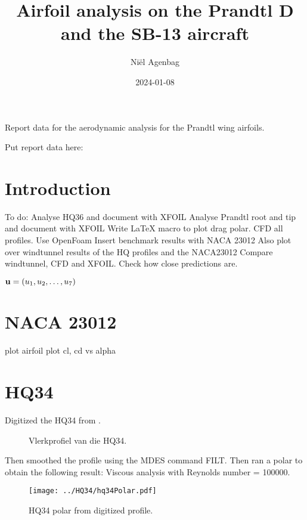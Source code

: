 \documentclass{article}
\title{Airfoil analysis on the Prandtl D and the SB-13 aircraft}
\author{Ni\"el Agenbag}
\date{2024-01-08}
\begin{document}
\maketitle

Report data for the aerodynamic analysis for the Prandtl wing airfoils.

Put report data here:

\section{Introduction}


To do:
Analyse HQ36 and document with XFOIL
Analyse Prandtl root and tip and document with XFOIL
Write LaTeX macro to plot drag polar.
CFD all profiles.  Use OpenFoam
Insert benchmark results with NACA 23012
Also plot over windtunnel results of the HQ profiles and the NACA23012
Compare windtunnel, CFD and XFOIL.  Check how close predictions are.

$\mathbf u=(u_1,u_2,\ldots,u_{7})$


\section{NACA 23012}

plot airfoil
plot cl, cd vs alpha

\section{HQ34}

Digitized the HQ34 from .


\begin{figure}[H]
	\begin{center}
	\end{center}
	\caption{Vlerkprofiel van die HQ34.}
	\label{Fig: Vlerkprofiel HQ34}
\end{figure}


Then smoothed the profile using the MDES command FILT.
Then ran a polar to obtain the following result:
Viscous analysis with Reynolds number = 100000.

\begin{figure}[H]
\centering
\texttt{[image: ../HQ34/hq34Polar.pdf]}
\caption{HQ34 polar from digitized profile.}
\end{figure}
\end{document}

